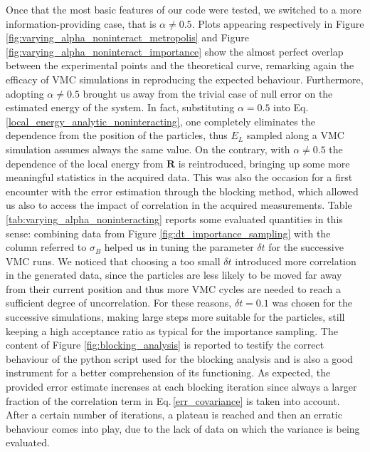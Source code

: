 Once that the most basic features of our code were tested, we switched to a more information-providing case, that is $\alpha\neq 0.5$. Plots appearing respectively in Figure \ref{fig:varying_alpha_noninteract_metropolis} and Figure \ref{fig:varying_alpha_noninteract_importance} show the almost perfect overlap between the experimental points and the theoretical curve, remarking again the efficacy of VMC simulations in reproducing the expected behaviour. Furthermore, adopting $\alpha\neq0.5$ brought us away from the trivial case of null error on the estimated energy of the system. In fact, substituting $\alpha=0.5$ into Eq.\,\ref{local_energy_analytic_noninteracting}, one completely eliminates the dependence from the position of the particles, thus $E_L$ sampled along a VMC simulation assumes always the same value. On the contrary, with $\alpha\neq0.5$ the dependence of the local energy from $\bm{R}$ is reintroduced, bringing up some more meaningful statistics in the acquired data. This was also the occasion for a first encounter with the error estimation through the blocking method, which allowed us also to access the impact of correlation in the acquired measurements. Table \ref{tab:varying_alpha_noninteracting} reports some evaluated quantities in this sense: combining data from Figure \ref{fig:dt_importance_sampling} with the column referred to $\sigma_B$ helped us in tuning the parameter $\delta t$ for the successive VMC runs. We noticed that choosing a too small $\delta t$ introduced more correlation in the generated data, since the particles are less likely to be moved far away from their current position and thus more VMC cycles are needed to reach a sufficient degree of uncorrelation. For these reasons, $\delta t=0.1$ was chosen for the successive simulations, making large steps more suitable for the particles, still keeping a high acceptance ratio as typical for the importance sampling. The content of Figure \ref{fig:blocking_analysis} is reported to testify the correct behaviour of the python script used for the blocking analysis and is also a good instrument for a better comprehension of its functioning. As expected, the provided error estimate increases at each blocking iteration since always a larger fraction of the correlation term in Eq.\,\ref{err_covariance} is taken into account. After a certain number of iterations, a plateau is reached and then an erratic behaviour comes into play, due to the lack of data on which the variance is being evaluated. \\

